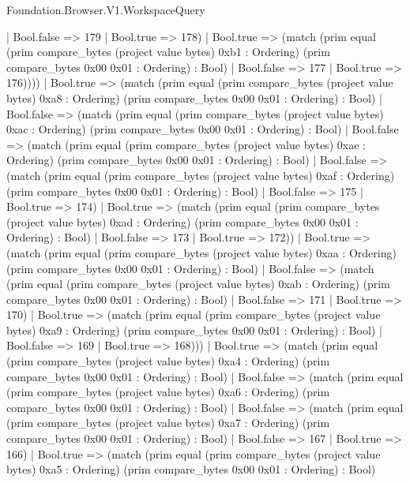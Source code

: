 \begin{lexlean}{Foundation.Browser.V1.WorkspaceQuery}
\begin{semanticmodule}
{                    | Bool.false => 179
                    | Bool.true => 178)
                  | Bool.true => (match (prim equal (prim compare_bytes (project value bytes) 0xb1 : Ordering) (prim compare_bytes 0x00 0x01 : Ordering) : Bool)
                    | Bool.false => 177
                    | Bool.true => 176))))
            | Bool.true => (match (prim equal (prim compare_bytes (project value bytes) 0xa8 : Ordering) (prim compare_bytes 0x00 0x01 : Ordering) : Bool)
              | Bool.false => (match (prim equal (prim compare_bytes (project value bytes) 0xac : Ordering) (prim compare_bytes 0x00 0x01 : Ordering) : Bool)
                | Bool.false => (match (prim equal (prim compare_bytes (project value bytes) 0xae : Ordering) (prim compare_bytes 0x00 0x01 : Ordering) : Bool)
                  | Bool.false => (match (prim equal (prim compare_bytes (project value bytes) 0xaf : Ordering) (prim compare_bytes 0x00 0x01 : Ordering) : Bool)
                    | Bool.false => 175
                    | Bool.true => 174)
                  | Bool.true => (match (prim equal (prim compare_bytes (project value bytes) 0xad : Ordering) (prim compare_bytes 0x00 0x01 : Ordering) : Bool)
                    | Bool.false => 173
                    | Bool.true => 172))
                | Bool.true => (match (prim equal (prim compare_bytes (project value bytes) 0xaa : Ordering) (prim compare_bytes 0x00 0x01 : Ordering) : Bool)
                  | Bool.false => (match (prim equal (prim compare_bytes (project value bytes) 0xab : Ordering) (prim compare_bytes 0x00 0x01 : Ordering) : Bool)
                    | Bool.false => 171
                    | Bool.true => 170)
                  | Bool.true => (match (prim equal (prim compare_bytes (project value bytes) 0xa9 : Ordering) (prim compare_bytes 0x00 0x01 : Ordering) : Bool)
                    | Bool.false => 169
                    | Bool.true => 168)))
              | Bool.true => (match (prim equal (prim compare_bytes (project value bytes) 0xa4 : Ordering) (prim compare_bytes 0x00 0x01 : Ordering) : Bool)
                | Bool.false => (match (prim equal (prim compare_bytes (project value bytes) 0xa6 : Ordering) (prim compare_bytes 0x00 0x01 : Ordering) : Bool)
                  | Bool.false => (match (prim equal (prim compare_bytes (project value bytes) 0xa7 : Ordering) (prim compare_bytes 0x00 0x01 : Ordering) : Bool)
                    | Bool.false => 167
                    | Bool.true => 166)
                  | Bool.true => (match (prim equal (prim compare_bytes (project value bytes) 0xa5 : Ordering) (prim compare_bytes 0x00 0x01 : Ordering) : Bool)
}
\end{semanticmodule}
\end{lexlean}
